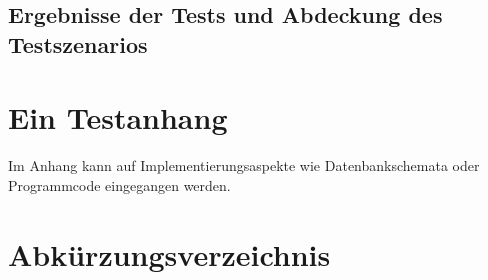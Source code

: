 \documentclass[listof=totocnumbered, bibliography=totocnumbered]{scrreprt}
\begin{document}
  
  \newpage
  
  \section{Ergebnisse der Tests und Abdeckung des Testszenarios}
  
  
  
  \appendix
  
  \chapter{Ein Testanhang}
  
  Im Anhang kann auf Implementierungsaspekte wie Datenbankschemata
  oder Programmcode eingegangen werden.
  
  
  \chapter{Abkürzungsverzeichnis}
  \begin{acronym}
    \setlength{\itemsep}{-\parsep}
  \end{acronym}
  
  
  \listoffigures
  
  
  \listoftables
  
  
  
  \cleardoublepage
  
\end{document}
